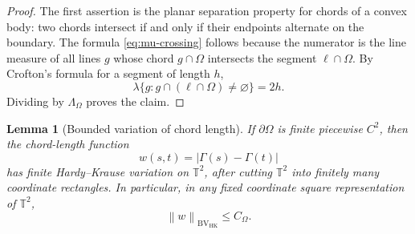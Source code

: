 \documentclass[11pt]{article}
\newtheorem{lemma}[theorem]{Lemma}
\theoremstyle{definition}
\newcommand{\T}{\mathbb T}
\newcommand{\BVHK}{\operatorname{BV}_{\mathrm{HK}}}
\newcommand{\norm}[1]{\left\|#1\right\|}
\begin{document}
\begin{proof}
The first assertion is the planar separation property for chords of a convex body: two chords intersect if and only if their endpoints alternate on the boundary. The formula \eqref{eq:mu-crossing} follows because the numerator is the line measure of all lines $g$ whose chord $g\cap\Omega$ intersects the segment $\ell\cap\Omega$. By Crofton's formula for a segment of length $h$,
\[
        \lambda\{g:g\cap(\ell\cap\Omega)\ne\varnothing\}=2h.
\]
Dividing by $\Lambda_\Omega$ proves the claim.
\end{proof}

\begin{lemma}[Bounded variation of chord length]\label{lem:chord-length-bv}
If $\partial\Omega$ is finite piecewise $C^2$, then the chord-length function
\[
        w(s,t)=|\Gamma(s)-\Gamma(t)|
\]
has finite Hardy--Krause variation on $\T^2$, after cutting $\T^2$ into finitely many coordinate rectangles.  In particular, in any fixed coordinate square representation of $\T^2$,
\[
        \norm{w}_{\BVHK}\le C_\Omega.
\]
\end{lemma}
\end{document}
